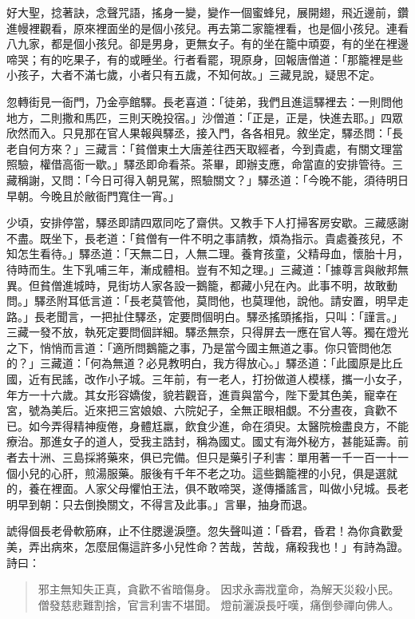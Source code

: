 好大聖，捻著訣，念聲咒語，搖身一變，變作一個蜜蜂兒，展開翅，飛近邊前，鑽進幔裡觀看，原來裡面坐的是個小孩兒。再去第二家籠裡看，也是個小孩兒。連看八九家，都是個小孩兒。卻是男身，更無女子。有的坐在籠中頑耍，有的坐在裡邊啼哭；有的吃果子，有的或睡坐。行者看罷，現原身，回報唐僧道：「那籠裡是些小孩子，大者不滿七歲，小者只有五歲，不知何故。」三藏見說，疑思不定。

忽轉街見一衙門，乃金亭館驛。長老喜道：「徒弟，我們且進這驛裡去：一則問他地方，二則撒和馬匹，三則天晚投宿。」沙僧道：「正是，正是，快進去耶。」四眾欣然而入。只見那在官人果報與驛丞，接入門，各各相見。敘坐定，驛丞問：「長老自何方來？」三藏言：「貧僧東土大唐差往西天取經者，今到貴處，有關文理當照驗，權借高衙一歇。」驛丞即命看茶。茶畢，即辦支應，命當直的安排管待。三藏稱謝，又問：「今日可得入朝見駕，照驗關文？」驛丞道：「今晚不能，須待明日早朝。今晚且於敝衙門寬住一宵。」

少頃，安排停當，驛丞即請四眾同吃了齋供。又教手下人打掃客房安歇。三藏感謝不盡。既坐下，長老道：「貧僧有一件不明之事請教，煩為指示。貴處養孩兒，不知怎生看待。」驛丞道：「天無二日，人無二理。養育孩童，父精母血，懷胎十月，待時而生。生下乳哺三年，漸成體相。豈有不知之理。」三藏道：「據尊言與敝邦無異。但貧僧進城時，見街坊人家各設一鵝籠，都藏小兒在內。此事不明，故敢動問。」驛丞附耳低言道：「長老莫管他，莫問他，也莫理他，說他。請安置，明早走路。」長老聞言，一把扯住驛丞，定要問個明白。驛丞搖頭搖指，只叫：「謹言。」三藏一發不放，執死定要問個詳細。驛丞無奈，只得屏去一應在官人等。獨在燈光之下，悄悄而言道：「適所問鵝籠之事，乃是當今國主無道之事。你只管問他怎的？」三藏道：「何為無道？必見教明白，我方得放心。」驛丞道：「此國原是比丘國，近有民謠，改作小子城。三年前，有一老人，打扮做道人模樣，攜一小女子，年方一十六歲。其女形容嬌俊，貌若觀音，進貢與當今，陛下愛其色美，寵幸在宮，號為美后。近來把三宮娘娘、六院妃子，全無正眼相覷。不分晝夜，貪歡不已。如今弄得精神瘦倦，身體尪羸，飲食少進，命在須臾。太醫院檢盡良方，不能療治。那進女子的道人，受我主誥封，稱為國丈。國丈有海外秘方，甚能延壽。前者去十洲、三島採將藥來，俱已完備。但只是藥引子利害：單用著一千一百一十一個小兒的心肝，煎湯服藥。服後有千年不老之功。這些鵝籠裡的小兒，俱是選就的，養在裡面。人家父母懼怕王法，俱不敢啼哭，遂傳播謠言，叫做小兒城。長老明早到朝：只去倒換關文，不得言及此事。」言畢，抽身而退。

諕得個長老骨軟筋麻，止不住腮邊淚墮。忽失聲叫道：「昏君，昏君！為你貪歡愛美，弄出病來，怎麼屈傷這許多小兒性命？苦哉，苦哉，痛殺我也！」有詩為證。詩曰：
\begin{quote}
邪主無知失正真，貪歡不省暗傷身。
因求永壽戕童命，為解天災殺小民。
僧發慈悲難割捨，官言利害不堪聞。
燈前灑淚長吁嘆，痛倒參禪向佛人。
\end{quote}

